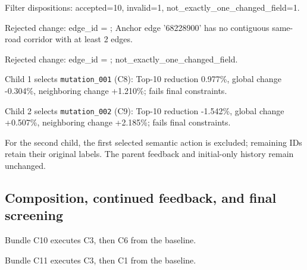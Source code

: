 Filter dispositions: accepted=10, invalid=1, not\_exactly\_one\_changed\_field=1.

Rejected change: edge\_id = ; Anchor edge '68228900' has no contiguous same-road corridor with at least 2 edges.

Rejected change: edge\_id = ; not\_exactly\_one\_changed\_field.

Child 1 selects \texttt{mutation\_001} (C8): Top-10 reduction 0.977\%, global change -0.304\%, neighboring change +1.210\%; fails final constraints.

Child 2 selects \texttt{mutation\_002} (C9): Top-10 reduction -1.542\%, global change +0.507\%, neighboring change +2.185\%; fails final constraints.

For the second child, the first selected semantic action is excluded; remaining IDs retain their original labels. The parent feedback and initial-only history remain unchanged.

\subsection*{Composition, continued feedback, and final screening}

Bundle C10 executes C3, then C6 from the baseline.

Bundle C11 executes C3, then C1 from the baseline.

